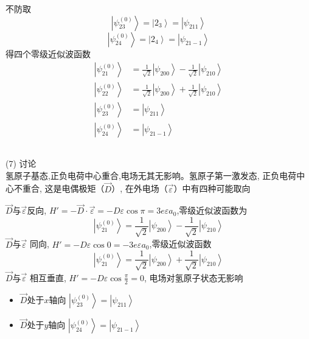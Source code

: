 \begin{frame}
  \frametitle{}
不防取 
\begin{equation*}
  \left\vert \psi ^{(0)}_{23} \right\rangle = \left\vert 2_3 \right\rangle = \left\vert\psi _{211} \right\rangle \end{equation*}
\begin{equation*}
  \left\vert \psi ^{(0)}_{24} \right\rangle = \left\vert 2_4 \right\rangle = \left\vert\psi _{21-1} \right\rangle \end{equation*}
得四个零级近似波函数
\begin{equation*}
  \begin{aligned}
    \left\vert \psi ^{(0)}_{21} \right\rangle &= \frac{1}{\sqrt{2} } \left\vert \psi _{200} \right\rangle
    -\frac{1}{\sqrt{2} } \left\vert\psi _{210} \right\rangle \\ 
    \left\vert \psi ^{(0)}_{22} \right\rangle &= \frac{1}{\sqrt{2} } \left\vert \psi _{200} \right\rangle
    +\frac{1}{\sqrt{2} } \left\vert\psi _{210} \right\rangle \\ 
    \left\vert \psi ^{(0)}_{23} \right\rangle &= \left\vert\psi _{211} \right\rangle \\ 
    \left\vert \psi ^{(0)}_{24} \right\rangle &= \left\vert\psi _{21-1} \right\rangle \\
  \end{aligned} 
\end{equation*}
\end{frame} 

\begin{frame}
  \frametitle{}
  (7) 讨论\\
  氢原子基态,正负电荷中心重合,电场无其无影响。氢原子第一激发态, 正负电荷中心不重合, 这是电偶极矩（$\vec{D}$）, 在外电场（$\vec{\varepsilon}$）中有四种可能取向 \\
  \begin{itemize}
    \Item $\vec{D}$与$\vec{\varepsilon}$反向, $H' = - \vec{D} \cdot \vec{\varepsilon} = -D\varepsilon \cos\pi = 3 e \varepsilon a_0$,零级近似波函数为 
    $$
    \left\vert \psi ^{(0)}_{21} \right\rangle = \frac{1}{\sqrt{2} } \left\vert \psi _{200} \right\rangle -\frac{1}{\sqrt{2} } \left\vert\psi _{210} \right\rangle  
    $$ 
    \Item $\vec{D}$与$\vec{\varepsilon}$ 同向, $H' = -D\varepsilon \cos 0 = - 3 e \varepsilon a_0$,零级近似波函数
    $$
    \left\vert \psi ^{(0)}_{21} \right\rangle = \frac{1}{\sqrt{2} } \left\vert \psi _{200} \right\rangle + \frac{1}{\sqrt{2} } \left\vert\psi _{210} \right\rangle 
    $$ 
    \Item $\vec{D}$与$\vec{\varepsilon}$ 相互垂直, $H' = -D\varepsilon \cos \frac{\pi}{2} = 0$, 电场对氢原子状态无影响 \\
    \begin{itemize}
      \item $\vec{D}$处于$x$轴向 $\left\vert \psi ^{(0)}_{23} \right\rangle = \left\vert\psi _{211} \right\rangle$
      \item $\vec{D}$处于$y$轴向 $\left\vert \psi ^{(0)}_{24} \right\rangle = \left\vert\psi _{21-1} \right\rangle$
    \end{itemize}
  \end{itemize}
\end{frame} 

